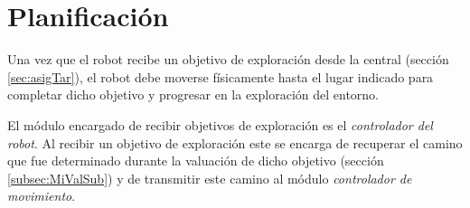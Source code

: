 


\section{Planificación}\label{sec:miNav}


Una vez que el robot recibe un objetivo de exploración desde la central
(sección \ref{sec:asigTar}), el robot debe moverse físicamente hasta el lugar
indicado para completar dicho objetivo y progresar en la exploración del entorno.

El módulo encargado de recibir objetivos de exploración es el \emph{controlador
del robot}. Al recibir un objetivo de exploración este se encarga de recuperar
el camino que fue determinado durante la valuación de dicho objetivo (sección
\ref{subsec:MiValSub}) y de transmitir este camino al módulo \emph{controlador
de movimiento}. 





